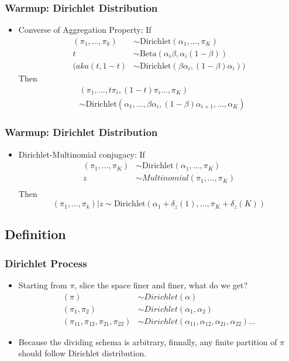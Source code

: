 \documentclass{beamer}
\begin{document}
\begin{frame}
	\frametitle{Warmup: Dirichlet Distribution}
	\begin{itemize}
		\item {Converse of Aggregation Property:}	If 
		\begin{align*}
		(\pi_1,\dots, \pi_k) & \sim \text{Dirichlet}(\alpha_1, \ldots, \pi_K) \\
		t & \sim \text{Beta}(\alpha_i \beta, \alpha_i (1-\beta)) \\
		(aka (t, 1-t) &\sim \text{Dirichlet}(\beta\alpha_i , (1-\beta)\alpha_i ))
		\end{align*}
		Then
		\begin{align*}
		& (\pi_1,\ldots,t\pi_i,(1-t)\pi_i\ldots, \pi_K) \\
		& \sim \text{Dirichlet}(\alpha_1,\ldots,\beta\alpha_i, (1-\beta)\alpha_{i+1}, \ldots, \alpha_K) 
		\end{align*}
	\end{itemize}
\end{frame}
\begin{frame}
	\frametitle{Warmup: Dirichlet Distribution}
	\begin{itemize}
		\item {Dirichlet-Multinomial conjugacy:}	If 
		\begin{align*}
		(\pi_1,\dots, \pi_K) & \sim \text{Dirichlet}(\alpha_1, \ldots, \pi_K) \\
		z & \sim Multinomial(\pi_1,\dots, \pi_K) \\
		\end{align*}
		Then
		\[
		(\pi_1,\dots, \pi_k)|z \sim \text{Dirichlet}(\alpha_1+\delta_z(1), \ldots, \pi_K+\delta_z(K))
		\]
	\end{itemize}
\end{frame}

\subsection{Definition}
\begin{frame}
	\frametitle{Dirichlet Process}
	\begin{itemize}
		\item Starting from $\pi$, slice the space finer and finer, what do we get?
		\begin{align*}
			(\pi) & \sim Dirichlet(\alpha) \\
			(\pi_1, \pi_2) & \sim Dirichlet(\alpha_1, \alpha_2) \\
			(\pi_{11},\pi_{12}, \pi_{21}, \pi_{22}) & \sim Dirichlet(\alpha_{11},\alpha_{12}, \alpha_{21},\alpha_{22}) \ldots 
		\end{align*}
		\item Because the dividing schema is arbitrary, finnally, any finite partition of $\pi$ should follow Dirichlet distribution.
	\end{itemize}
\end{frame}
\end{document}

